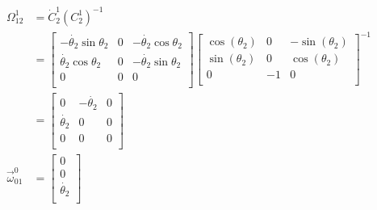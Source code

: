 \begin{parts}
\begin{subparts}

        \solution
        \begin{equation*}
            \begin{split}
                {\Omega}^1_{12} & = \dot{C}^1_2(C^1_2)^{-1}\\
                & =
                \begin{bmatrix}
                    -\dot{\theta_2}\sin{\theta_2} & 0 & -\dot{\theta_2}\cos{\theta_2} \\
                    \dot{\theta_2}\cos{\theta_2}  & 0 & -\dot{\theta_2}\sin{\theta_2} \\
                    0                             & 0 & 0                             \\
                \end{bmatrix}
                \begin{bmatrix}
                    \cos(\theta_2) & 0  & -\sin(\theta_2) \\
                    \sin(\theta_2) & 0  & \cos(\theta_2)  \\
                    0              & -1 & 0               \\
                \end{bmatrix}^{-1} \\
                & =
                \begin{bmatrix}
                    0              & -\dot{\theta_2} & 0 \\
                    \dot{\theta_2} & 0               & 0 \\
                    0              & 0               & 0 \\
                \end{bmatrix} \\
                \vec{\omega}^0_{01} & =
                \begin{bmatrix}
                    0              \\
                    0              \\
                    \dot{\theta_2} \\
                \end{bmatrix}
            \end{split}
        \end{equation*}



\end{subparts}
\end{parts}
